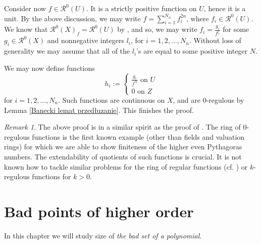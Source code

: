 \documentclass[12pt,reqno]{amsart}   	%
\theoremstyle{remark}
\newtheorem{remark}[thm]{Remark}
\newcommand{\RR}{\mathcal{R}}
\begin{document}
Consider now $f \in \RR^0(U)$. It is a strictly positive function on $U$, hence it is a unit. By the above discussion, we may write $f=\sum_{i=1}^{N_n}f_i^{2n}$, where $f_i \in \RR^0(U)$. We know that $\RR^0(X)_f=\RR^0(U)$ by \cite[Proposition 1.4]{bk2023}, and so, we may write $f_i=\frac{g_i}{f^{l_i}}$ for some $g_i \in \RR^0(X)$ and nonnegative integers $l_i$, for $i=1,2,\dots, N_n$. Without loss of generality we may assume that all of the $l_i$'s are equal to some positive integer $N$.

We may now define functions 
\begin{equation*}
    h_i:=
    \begin{cases}
        \frac{g_i}{f^N} \text{ on } U \\
        0 \text{ on } Z
    \end{cases}
\end{equation*}
for $i=1,2,\dots, N_n$. Such functions are continuous on $X$, and are $0$-regulous by Lemma \ref{Banecki lemat przedłuzanie}. This finishes the proof.


\begin{remark}
    The above proof is in a similar spirit as the proof of \cite[Theorem 2.6]{bk2023}. The ring of $0$-regulous functions is the first known example (other than fields and valuation rings) for which we are able to show finiteness of the higher even Pythagoras numbers. The extendability of quotients of such functions is crucial. It is not known how to tackle similar problems for the ring of regular functions (cf. \cite[Remark 4.14]{kowalczyk2025}) or $k$-regulous functions for $k>0$.
\end{remark}
\section{Bad points of higher order}

In this chapter we will study size of \textit{the bad set of a polynomial}.
\end{document}
